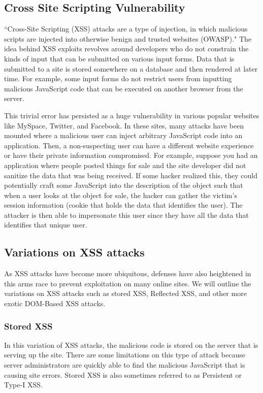 \documentclass[conference]{IEEEtran}
\begin{document}
\subsection{Cross Site Scripting Vulnerability}

``Cross-Site Scripting (XSS) attacks are a type of injection, in which malicious scripts are injected into otherwise benign and trusted websites (OWASP)." The idea behind XSS exploits revolves around developers who do not constrain the kinds of input that can be submitted on various input forms. Data that is submitted to a site is stored somewhere on a database and then rendered at later time. For example, some input forms do not restrict users from inputting malicious JavaScript code that can be executed on another browser from the server.

This trivial error has persisted as a huge vulnerability in various popular websites like MySpace, Twitter, and Facebook. In these sites, many attacks have been mounted where a malicious user can inject arbitrary JavaScript code into an application. Then, a non-suspecting user can have a different website experience or have their private information compromised. For example, suppose you had an application where people posted things for sale and the site developer did not sanitize the data that was being received. If some hacker realized this, they could potentially craft some JavaScript into the description of the object such that when a user looks at the object for sale, the hacker can gather the victim's session information (cookie that holds the data that identifies the user). The attacker is then able to impersonate this user since they have all the data that identifies that unique user.

\subsection {Variations on XSS attacks}
As XSS attacks have become more ubiquitous, defenses have also heightened in this arms race to prevent exploitation on many online sites. We will outline the variations on XSS attacks such as stored XSS, Reflected XSS, and other more exotic DOM-Based XSS attacks.\\

\subsubsection{Stored XSS}
In this variation of XSS attacks, the malicious code is stored on the server that is serving up the site. There are some limitations on this type of attack because server administrators are quickly able to find the malicious JavaScript that is causing site errors. Stored XSS is also sometimes referred to as Persistent or Type-I XSS.\\
\end{document}
